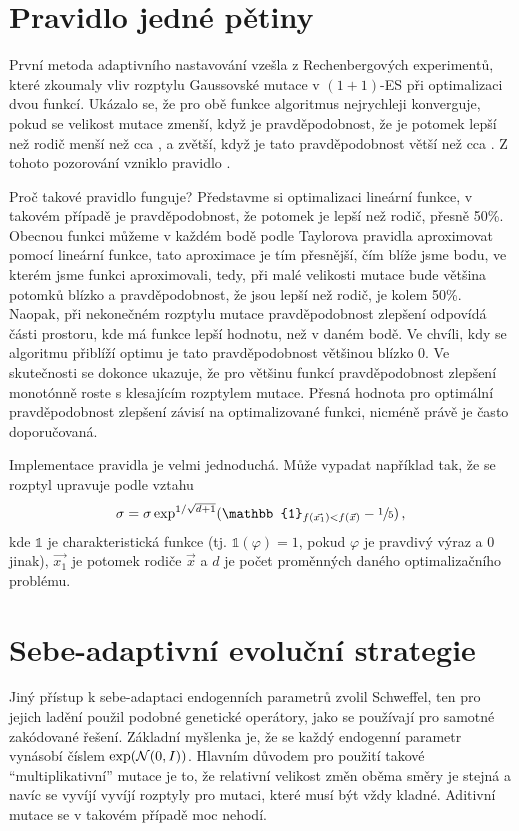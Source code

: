 \newcommand{\fifth}{\sfrac{1}{5}\xspace}

\section{Pravidlo jedné pětiny}

První metoda adaptivního nastavování vzešla z Rechenbergových experimentů,\cite{rechenberg1973} které zkoumaly vliv rozptylu Gaussovské mutace v $(1+1)$-ES při optimalizaci dvou funkcí. Ukázalo se, že pro obě funkce algoritmus nejrychleji konverguje, pokud se velikost mutace zmenší, když je pravděpodobnost, že je potomek lepší než rodič menší než cca \fifth, a zvětší, když je tato pravděpodobnost větší než cca \fifth. Z tohoto pozorování vzniklo pravidlo \fifth.

Proč takové pravidlo funguje? Představme si optimalizaci lineární funkce, v takovém případě je pravděpodobnost, že potomek je lepší než rodič, přesně 50\%. 
Obecnou funkci můžeme v každém bodě podle Taylorova pravidla aproximovat pomocí lineární funkce, tato aproximace je tím přesnější, čím blíže jsme bodu, ve kterém jsme funkci aproximovali, tedy, při malé velikosti mutace bude většina potomků blízko a pravděpodobnost, že jsou lepší než rodič, je kolem 50\%. Naopak, při nekonečném rozptylu mutace pravděpodobnost zlepšení odpovídá části prostoru, kde má funkce lepší hodnotu, než v daném bodě. Ve chvíli, kdy se algoritmu přiblíží optimu je tato pravděpodobnost většinou blízko 0. Ve skutečnosti se dokonce ukazuje, že pro většinu funkcí pravděpodobnost zlepšení monotónně roste s klesajícím rozptylem mutace. Přesná hodnota pro optimální pravděpodobnost zlepšení závisí na optimalizované funkci, nicméně právě \fifth je často doporučovaná.

Implementace pravidla \fifth je velmi jednoduchá. Může vypadat například tak, že se rozptyl upravuje podle vztahu 
$$\sigma = \sigma\exp^{1/\sqrt{d+1}}(\mathbb{1}_{f(\vec{x_1})<f(\vec{x})}-\fifth)\,,$$ kde $\mathbb{1}$ je charakteristická funkce (tj. $\mathbb{1}(\varphi) = 1$, pokud $\varphi$ je pravdivý výraz a $0$ jinak), $\vec{x_1}$ je potomek rodiče $\vec{x}$ a $d$ je počet proměnných daného optimalizačního problému.

\section{Sebe-adaptivní evoluční strategie}

Jiný přístup k sebe-adaptaci endogenních parametrů zvolil Schweffel\cite{schwefel1977numerische}, ten pro jejich ladění použil podobné genetické operátory, jako se používají pro samotné zakódované řešení. Základní myšlenka je, že se každý endogenní parametr vynásobí číslem $\exp(\mathcal{N}(0, I))$. Hlavním důvodem pro použití takové ``multiplikativní'' mutace je to, že relativní velikost změn oběma směry je stejná a navíc se vyvíjí vyvíjí rozptyly pro mutaci, které musí být vždy kladné. Aditivní mutace se v takovém případě moc nehodí.

